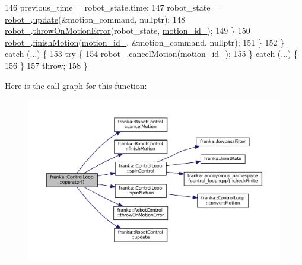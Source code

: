 \begin{DoxyCode}
146       previous\_time = robot\_state.time;
147       robot\_state = \hyperlink{classfranka_1_1ControlLoop_aa618899fdcd85da8659fb3b1bd8c65b3}{robot\_}.\hyperlink{classfranka_1_1RobotControl_a5b581e84547a76ad1600158345cfd40d}{update}(&motion\_command, \textcolor{keyword}{nullptr});
148       \hyperlink{classfranka_1_1ControlLoop_aa618899fdcd85da8659fb3b1bd8c65b3}{robot\_}.\hyperlink{classfranka_1_1RobotControl_a796e9fb049ffc36ea44bec85f24e2fe4}{throwOnMotionError}(robot\_state, \hyperlink{classfranka_1_1ControlLoop_a4dd139afcabc3a50bb9eb35ca44845fa}{motion\_id\_});
149     \}
150     \hyperlink{classfranka_1_1ControlLoop_aa618899fdcd85da8659fb3b1bd8c65b3}{robot\_}.\hyperlink{classfranka_1_1RobotControl_aae1629178b5eeb5d8e4d41d2f746f2fc}{finishMotion}(\hyperlink{classfranka_1_1ControlLoop_a4dd139afcabc3a50bb9eb35ca44845fa}{motion\_id\_}, &motion\_command, \textcolor{keyword}{nullptr});
151   \}
152 \} \textcolor{keywordflow}{catch} (...) \{
153   \textcolor{keywordflow}{try} \{
154     \hyperlink{classfranka_1_1ControlLoop_aa618899fdcd85da8659fb3b1bd8c65b3}{robot\_}.\hyperlink{classfranka_1_1RobotControl_a8eb19b5e21e2ac8d9c98bffe2dd9124d}{cancelMotion}(\hyperlink{classfranka_1_1ControlLoop_a4dd139afcabc3a50bb9eb35ca44845fa}{motion\_id\_});
155   \} \textcolor{keywordflow}{catch} (...) \{
156   \}
157   \textcolor{keywordflow}{throw};
158 \}
\end{DoxyCode}
Here is the call graph for this function\+:
\nopagebreak
\begin{figure}[H]
\begin{center}
\leavevmode
\includegraphics[width=350pt]{classfranka_1_1ControlLoop_acfd08b5dca8a6618b2c4f8aa0ce751b7_cgraph}
\end{center}
\end{figure}
\mbox{\label{classfranka_1_1ControlLoop_a480c19a57bf2a7df4ab9c6f68667b865}} 
